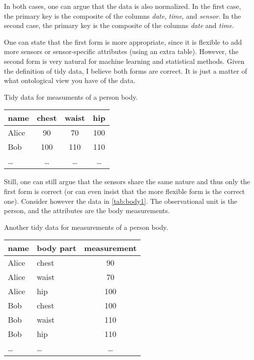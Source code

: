 In both cases, one can argue that the data is also normalized.  In the first case, the
primary key is the composite of the columns \emph{date}, \emph{time}, and \emph{sensor}.
In the second case, the primary key is the composite of the columns \emph{date} and
\emph{time}.

One can state that the first form is more appropriate, since it is flexible to add more
sensors or sensor-specific attributes (using an extra table).  However, the second form is very natural for machine learning and statistical
methods.  Given the definition of tidy data, I believe both forms are correct.  It is
just a matter of what ontological view you have of the data.

\begin{tablebox}[label=tab:body1]{Tidy data for measuments of a person body.}
  \centering
  \begin{tabular}{lccc}
    \toprule
    \textbf{name} & \textbf{chest} & \textbf{waist} & \textbf{hip} \\
    \midrule
    Alice & 90 & 70 & 100 \\
    Bob & 100 & 110 & 110 \\
    \dots & \dots & \dots & \dots \\
    \bottomrule
  \end{tabular}
\end{tablebox}

Still, one can still argue that the sensors share the same nature and thus only the first
form is correct (or can even insist that the more flexible form is the correct one).
Consider however the data in \cref{tab:body1}.  The observational unit is the person, and
the attributes are the body measurements.

\begin{tablebox}[label=tab:body2]{Another tidy data for measurements of a person body.}
  \centering
  \begin{tabular}{llc}
    \toprule
    \textbf{name} & \textbf{body part} & \textbf{measurement} \\
    \midrule
    Alice & chest & 90 \\
    Alice & waist & 70 \\
    Alice & hip & 100 \\
    Bob & chest & 100 \\
    Bob & waist & 110 \\
    Bob & hip & 110 \\
    \dots & \dots & \dots \\
    \bottomrule
  \end{tabular}
\end{tablebox}

